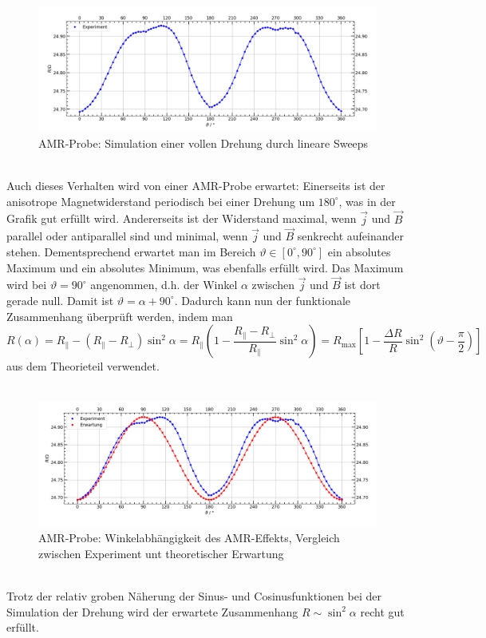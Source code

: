 \documentclass[german,  %
parskip=full,  %
]{scrartcl}
\begin{document}
\begin{figure}[h!]\centering
\includegraphics[width=\textwidth]{Probe1_Drehung.png}
\caption{AMR-Probe: Simulation einer vollen Drehung durch lineare Sweeps}
\end{figure}\\
Auch dieses Verhalten wird von einer AMR-Probe erwartet: Einerseits ist der anisotrope Magnetwiderstand periodisch bei einer Drehung um \(180^{\circ}\), was in der Grafik gut erfüllt wird. Andererseits ist der Widerstand maximal, wenn \(\vec{j}\) und \(\vec{B}\) parallel oder antiparallel sind und minimal, wenn \(\vec{j}\) und \(\vec{B}\) senkrecht aufeinander stehen. Dementsprechend erwartet man im Bereich \(\vartheta\in\left[0^{\circ},90^{\circ}\right]\) ein absolutes Maximum und ein absolutes Minimum, was ebenfalls erfüllt wird. Das Maximum wird bei \(\vartheta = 90^{\circ}\)  angenommen, d.h. der Winkel \(\alpha\) zwischen \(\vec{j}\) und \(\vec{B}\) ist dort gerade null. Damit ist \(\vartheta = \alpha + 90^{\circ}\). Dadurch kann nun der funktionale Zusammenhang überprüft werden, indem man
\[R(\alpha) = R_{\parallel} - (R_{\parallel} - R_{\perp})\sin^2\alpha = R_{\parallel} \left(1 - \frac{R_{\parallel} - R_{\perp}}{R_{\parallel}}\sin^2\alpha\right) = R_{\mathrm{max}}\left[1 - \frac{\Delta R}{R}\sin^2\left(\vartheta - \frac{\pi}{2}\right)\right] \]
aus dem Theorieteil verwendet. \\\\
\begin{figure}[h!]\centering
\includegraphics[width=\textwidth]{Probe1_Drehung_vs_Erwartung.png}
\caption{AMR-Probe: Winkelabhängigkeit des AMR-Effekts, Vergleich zwischen Experiment unt theoretischer Erwartung}
\end{figure} \\
Trotz der relativ groben Näherung der Sinus- und Cosinusfunktionen bei der Simulation der Drehung wird der erwartete Zusammenhang \(R\sim\sin^2\alpha\) recht gut erfüllt.
\end{document}
